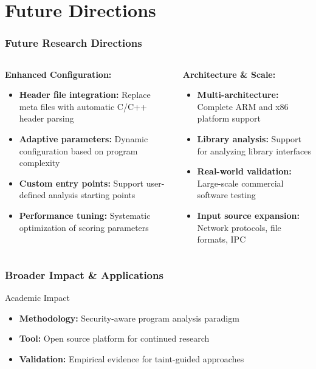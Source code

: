 \documentclass[aspectratio=169]{beamer}
\begin{document}
\section{Future Directions}

\begin{frame}
    \frametitle{Future Research Directions}
    \begin{columns}
        \begin{column}{0.5\textwidth}
            \textbf{Enhanced Configuration:}
            \begin{itemize}
                \item \textbf{Header file integration:} Replace meta files with automatic C/C++ header parsing
                \item \textbf{Adaptive parameters:} Dynamic configuration based on program complexity
                \item \textbf{Custom entry points:} Support user-defined analysis starting points
                \item \textbf{Performance tuning:} Systematic optimization of scoring parameters
            \end{itemize}
        \end{column}
        \begin{column}{0.5\textwidth}
            \textbf{Architecture \& Scale:}
            \begin{itemize}
                \item \textbf{Multi-architecture:} Complete ARM and x86 platform support
                \item \textbf{Library analysis:} Support for analyzing library interfaces
                \item \textbf{Real-world validation:} Large-scale commercial software testing
                \item \textbf{Input source expansion:} Network protocols, file formats, IPC
            \end{itemize}
        \end{column}
    \end{columns}
\end{frame}

\begin{frame}
    \frametitle{Broader Impact \& Applications}
    \begin{research}{Academic Impact}
        \begin{itemize}
            \item \textbf{Methodology:} Security-aware program analysis paradigm
            \item \textbf{Tool:} Open source platform for continued research
            \item \textbf{Validation:} Empirical evidence for taint-guided approaches
        \end{itemize}
    \end{research}
\end{frame}
\end{document}
